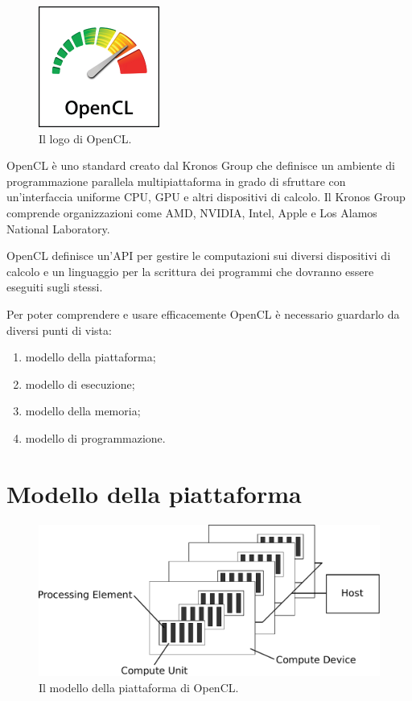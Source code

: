 \documentclass[12pt,a4paper,oneside]{book}
\begin{document}
\begin{figure}[h]
\begin{center}
\includegraphics[width=150px]{img/opencl-logo}
\caption{Il logo di OpenCL.\label{fig:opencl-logo}}
\end{center}
\end{figure}

\ac{OpenCL} è uno standard creato dal Kronos Group che definisce un ambiente di programmazione parallela multipiattaforma in grado di sfruttare con un'interfaccia uniforme \ac{CPU}, \ac{GPU} e altri dispositivi di calcolo\cite{bib:opencl}. Il Kronos Group comprende organizzazioni come AMD, NVIDIA, Intel, Apple e Los Alamos National Laboratory.

\ac{OpenCL} definisce un'\ac{API} per gestire le computazioni sui diversi dispositivi di calcolo e un linguaggio per la scrittura dei programmi che dovranno essere eseguiti sugli stessi.

Per poter comprendere e usare efficacemente \ac{OpenCL} è necessario guardarlo da diversi punti di vista:
\begin{enumerate}
\item modello della piattaforma;
\item modello di esecuzione;
\item modello della memoria;
\item modello di programmazione.
\end{enumerate}

\section{Modello della piattaforma}
\label{sec:opencl-platform}

\begin{figure}[h]
\begin{center}
\includegraphics[width=\textwidth]{img/opencl-platform-model}
\caption{Il modello della piattaforma di \ac{OpenCL}.\label{fig:opencl-platform-model}}
\end{center}
\end{figure}
\end{document}
